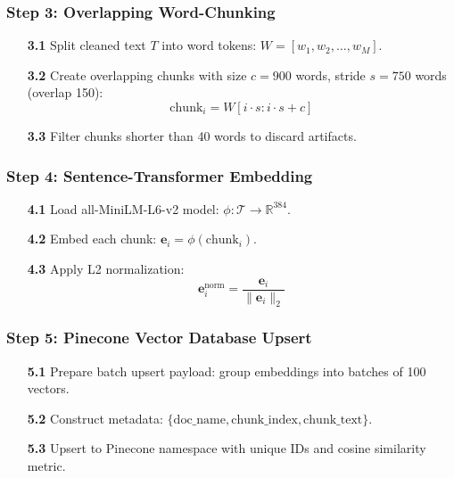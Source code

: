 \documentclass[12pt,a4paper]{report}
\begin{document}
\subsubsection*{Step 3: Overlapping Word-Chunking}
\begin{enumerate}
  \item[\textbf{3.1}] Split cleaned text $T$ into word tokens: $W = [w_1, w_2, \dots, w_M]$.
  \item[\textbf{3.2}] Create overlapping chunks with size $c = 900$ words, stride $s = 750$ words (overlap 150):
    \begin{equation}
      \text{chunk}_i = W[i \cdot s : i \cdot s + c]
    \end{equation}
  \item[\textbf{3.3}] Filter chunks shorter than 40 words to discard artifacts.
\end{enumerate}

\subsubsection*{Step 4: Sentence-Transformer Embedding}
\begin{enumerate}
  \item[\textbf{4.1}] Load all-MiniLM-L6-v2 model: $\phi: \mathcal{T} \to \mathbb{R}^{384}$.
  \item[\textbf{4.2}] Embed each chunk: $\mathbf{e}_i = \phi(\text{chunk}_i)$.
  \item[\textbf{4.3}] Apply L2 normalization:
    \begin{equation}
      \mathbf{e}_i^{\text{norm}} = \frac{\mathbf{e}_i}{\|\mathbf{e}_i\|_2}
    \end{equation}
\end{enumerate}

\subsubsection*{Step 5: Pinecone Vector Database Upsert}
\begin{enumerate}
  \item[\textbf{5.1}] Prepare batch upsert payload: group embeddings into batches of 100 vectors.
  \item[\textbf{5.2}] Construct metadata: $\{\text{doc\_name}, \text{chunk\_index}, \text{chunk\_text}\}$.
  \item[\textbf{5.3}] Upsert to Pinecone namespace with unique IDs and cosine similarity metric.
\end{enumerate}
\end{document}
